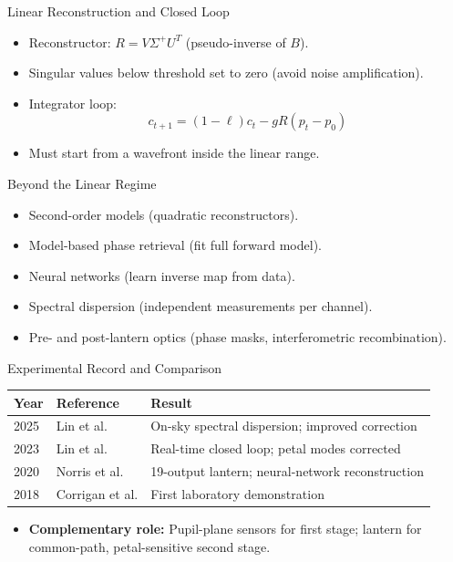 \documentclass[aspectratio=169,10pt]{beamer}
\begin{document}
\begin{frame}{Linear Reconstruction and Closed Loop}
\begin{itemize}
    \item Reconstructor: \(R = V \Sigma^+ U^T\) (pseudo-inverse of \(B\)).
    \item Singular values below threshold set to zero (avoid noise amplification).
    \item Integrator loop:
    \[
        c_{t+1} = (1-\ell) c_t - g R (p_t - p_0)
    \]
    \item Must start from a wavefront inside the linear range.
\end{itemize}
\end{frame}

\begin{frame}{Beyond the Linear Regime}
\begin{itemize}
    \item Second-order models (quadratic reconstructors).
    \item Model-based phase retrieval (fit full forward model).
    \item Neural networks (learn inverse map from data).
    \item Spectral dispersion (independent measurements per channel).
    \item Pre- and post-lantern optics (phase masks, interferometric recombination).
\end{itemize}
\end{frame}

\begin{frame}{Experimental Record and Comparison}
\begin{table}
\centering
\small
\begin{tabular}{@{}lll@{}}
\toprule
\textbf{Year} & \textbf{Reference} & \textbf{Result} \\
\midrule
2025 & Lin et al. & On-sky spectral dispersion; improved correction \\
2023 & Lin et al. & Real-time closed loop; petal modes corrected \\
2020 & Norris et al. & 19-output lantern; neural-network reconstruction \\
2018 & Corrigan et al. & First laboratory demonstration \\
\bottomrule
\end{tabular}
\end{table}
\begin{itemize}
    \item \textbf{Complementary role:} Pupil-plane sensors for first stage; lantern for common-path, petal-sensitive second stage.
\end{itemize}
\end{frame}
\end{document}
